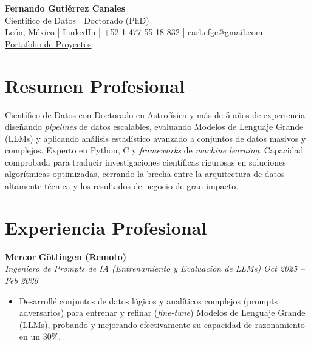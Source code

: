 \documentclass[10pt,a4paper]{article}
\begin{document}
\begin{center}
    {\Huge \textbf{Fernando Gutiérrez Canales}}\\
    {\Large Científico de Datos | Doctorado (PhD)}\\    
    León, México \quad | \quad \href{https://www.linkedin.com/in/fernando-guti%C3%A9rrez-canales-804876343/}{LinkedIn} \quad | \quad +52 1 477 55 18 832 \quad | \quad \href{mailto:carl.cfgc@gmail.com}{carl.cfgc@gmail.com} \\
     \href{https://fernando-canales.github.io/es/#projects}{Portafolio de Proyectos}
\end{center}

\vspace{1em}

\section*{Resumen Profesional}
Científico de Datos con Doctorado en Astrofísica y más de 5 años de experiencia diseñando \textit{pipelines} de datos escalables, evaluando Modelos de Lenguaje Grande (LLMs) y aplicando análisis estadístico avanzado a conjuntos de datos masivos y complejos. Experto en Python, C y \textit{frameworks} de \textit{machine learning}. Capacidad comprobada para traducir investigaciones científicas rigurosas en soluciones algorítmicas optimizadas, cerrando la brecha entre la arquitectura de datos altamente técnica y los resultados de negocio de gran impacto.

\section*{Experiencia Profesional}
\textbf{Mercor} \hfill \textbf{Göttingen (Remoto)} \\
\textit{Ingeniero de Prompts de IA (Entrenamiento y Evaluación de LLMs)} \hfill \textit{Oct 2025 -- Feb 2026}
\begin{itemize}[leftmargin=1.5em]
	\item Desarrollé conjuntos de datos lógicos y analíticos complejos (prompts adversarios) para entrenar y refinar (\textit{fine-tune}) Modelos de Lenguaje Grande (LLMs), probando y mejorando efectivamente su capacidad de razonamiento en un 30\%.
\end{itemize}
\end{document}
